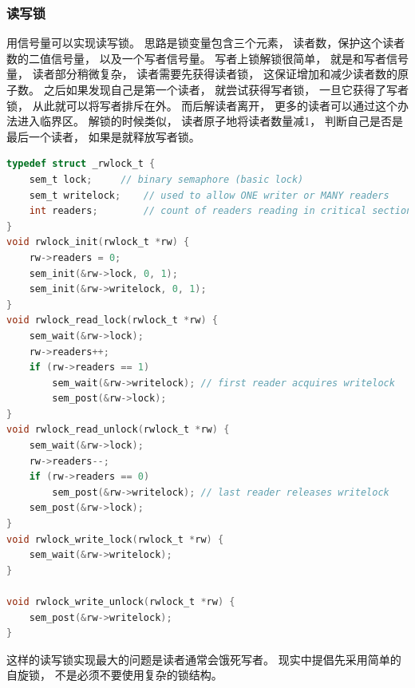 \documentclass[11pt]{article}
\begin{document}
\subsubsection{读写锁}
用信号量可以实现读写锁。
思路是锁变量包含三个元素，
读者数，保护这个读者数的二值信号量，
以及一个写者信号量。
写者上锁解锁很简单，
就是和写者信号量，
读者部分稍微复杂，
读者需要先获得读者锁，
这保证增加和减少读者数的原子数。
之后如果发现自己是第一个读者，
就尝试获得写者锁，
一旦它获得了写者锁，
从此就可以将写者排斥在外。
而后解读者离开，
更多的读者可以通过这个办法进入临界区。
解锁的时候类似，
读者原子地将读者数量减1，
判断自己是否是最后一个读者，
如果是就释放写者锁。
\begin{lstlisting}[language=C]
typedef struct _rwlock_t {
	sem_t lock;		// binary semaphore (basic lock)
	sem_t writelock;	// used to allow ONE writer or MANY readers
	int readers;		// count of readers reading in critical section
}
void rwlock_init(rwlock_t *rw) {
	rw->readers = 0;
	sem_init(&rw->lock, 0, 1);
	sem_init(&rw->writelock, 0, 1);
}
void rwlock_read_lock(rwlock_t *rw) {
	sem_wait(&rw->lock);
	rw->readers++;
	if (rw->readers == 1)
		sem_wait(&rw->writelock); // first reader acquires writelock
        sem_post(&rw->lock);
}
void rwlock_read_unlock(rwlock_t *rw) {
	sem_wait(&rw->lock);
	rw->readers--;
	if (rw->readers == 0)
		sem_post(&rw->writelock); // last reader releases writelock
	sem_post(&rw->lock);
}
void rwlock_write_lock(rwlock_t *rw) {
	sem_wait(&rw->writelock);
}

void rwlock_write_unlock(rwlock_t *rw) {
	sem_post(&rw->writelock);
}
\end{lstlisting}
这样的读写锁实现最大的问题是读者通常会饿死写者。
现实中提倡先采用简单的自旋锁，
不是必须不要使用复杂的锁结构。
\end{document}
